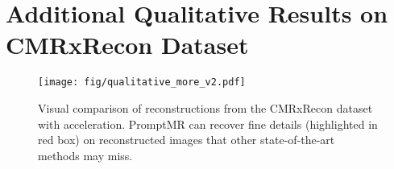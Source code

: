 \documentclass[runningheads]{llncs}
\begin{document}
{\section{Additional Qualitative Results on CMRxRecon Dataset}
\label{app:cmrxrecon_qualitative}



\begin{figure*}[h!]
\centering
\texttt{[image: fig/qualitative\_more\_v2.pdf]}
\caption{Visual comparison of reconstructions from the CMRxRecon dataset with  acceleration.
PromptMR can recover fine details (highlighted in red box) on reconstructed images that other state-of-the-art methods may miss.}
\label{fig:qualitative_more}
\end{figure*}

} 
\end{document}
